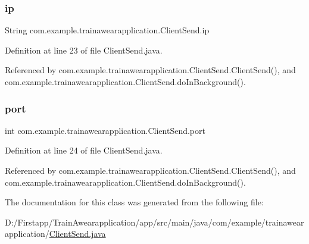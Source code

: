 \subsubsection{\texorpdfstring{ip}{ip}}
{\footnotesize\ttfamily String com.\+example.\+trainawearapplication.\+Client\+Send.\+ip\hspace{0.3cm}{\ttfamily [private]}}



Definition at line 23 of file Client\+Send.\+java.



Referenced by com.\+example.\+trainawearapplication.\+Client\+Send.\+Client\+Send(), and com.\+example.\+trainawearapplication.\+Client\+Send.\+do\+In\+Background().

\mbox{\label{classcom_1_1example_1_1trainawearapplication_1_1_client_send_a1295f5916c4527127a9dd68b7c6fe759}} 
\subsubsection{\texorpdfstring{port}{port}}
{\footnotesize\ttfamily int com.\+example.\+trainawearapplication.\+Client\+Send.\+port\hspace{0.3cm}{\ttfamily [private]}}



Definition at line 24 of file Client\+Send.\+java.



Referenced by com.\+example.\+trainawearapplication.\+Client\+Send.\+Client\+Send(), and com.\+example.\+trainawearapplication.\+Client\+Send.\+do\+In\+Background().



The documentation for this class was generated from the following file\+:\begin{DoxyCompactItemize}
\item 
D\+:/\+Firstapp/\+Train\+Awearapplication/app/src/main/java/com/example/trainawearapplication/\mbox{\hyperlink{_client_send_8java}{Client\+Send.\+java}}\end{DoxyCompactItemize}
